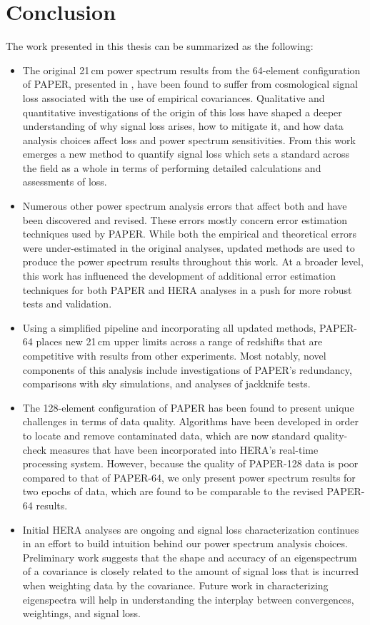 
\chapter{Conclusion}
\label{c.conclusion}

The work presented in this thesis can be summarized as the following:

\begin{itemize}
\item The original 21\,cm power spectrum results from the 64-element configuration of PAPER, presented in , have been found to suffer from cosmological signal loss associated with the use of empirical covariances. Qualitative and quantitative investigations of the origin of this loss have shaped a deeper understanding of why signal loss arises, how to mitigate it, and how data analysis choices affect loss and power spectrum sensitivities. From this work emerges a new method to quantify signal loss which sets a standard across the field as a whole in terms of performing detailed calculations and assessments of loss.
\item Numerous other power spectrum analysis errors that affect both \citet{parsons_et_al2014} and  have been discovered and revised. These errors mostly concern error estimation techniques used by PAPER. While both the empirical and theoretical errors were under-estimated in the original analyses, updated methods are used to produce the power spectrum results throughout this work. At a broader level, this work has influenced the development of additional error estimation techniques for both PAPER and HERA analyses in a push for more robust tests and validation.
\item Using a simplified pipeline and incorporating all updated methods, PAPER-64 places new 21\,cm upper limits across a range of redshifts that are competitive with results from other experiments. Most notably, novel components of this analysis include investigations of PAPER's redundancy, comparisons with sky simulations, and analyses of jackknife tests.
\item The 128-element configuration of PAPER has been found to present unique challenges in terms of data quality. Algorithms have been developed in order to locate and remove contaminated data, which are now standard quality-check measures that have been incorporated into HERA's real-time processing system. However, because the quality of PAPER-128 data is poor compared to that of PAPER-64, we only present power spectrum results for two epochs of data, which are found to be comparable to the revised PAPER-64 results.
\item Initial HERA analyses are ongoing and signal loss characterization continues in an effort to build intuition behind our power spectrum analysis choices. Preliminary work suggests that the shape and accuracy of an eigenspectrum of a covariance is closely related to the amount of signal loss that is incurred when weighting data by the covariance. Future work in characterizing eigenspectra will help in understanding the interplay between convergences, weightings, and signal loss.
\end{itemize}

